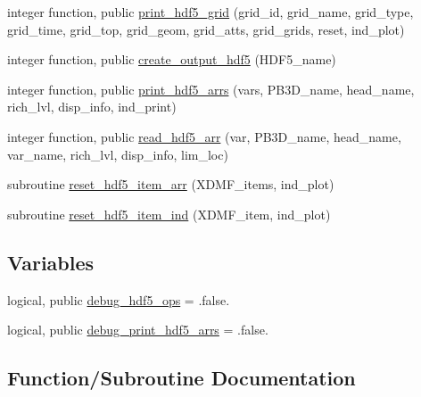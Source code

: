 \begin{DoxyCompactItemize}
integer function, public \hyperlink{namespacehdf5__ops_a144d595445778d89ec1a1bc0b12a94fb}{print\+\_\+hdf5\+\_\+grid} (grid\+\_\+id, grid\+\_\+name, grid\+\_\+type, grid\+\_\+time, grid\+\_\+top, grid\+\_\+geom, grid\+\_\+atts, grid\+\_\+grids, reset, ind\+\_\+plot)
\item 
integer function, public \hyperlink{namespacehdf5__ops_a1263636fffc4f4aa86f72bd5fd3352a0}{create\+\_\+output\+\_\+hdf5} (H\+D\+F5\+\_\+name)
\item 
integer function, public \hyperlink{namespacehdf5__ops_a18a07099350020b44d6fbe93ed36e804}{print\+\_\+hdf5\+\_\+arrs} (vars, P\+B3\+D\+\_\+name, head\+\_\+name, rich\+\_\+lvl, disp\+\_\+info, ind\+\_\+print)
\item 
integer function, public \hyperlink{namespacehdf5__ops_a5108e0d6f6b492cb981505ebceedd9ee}{read\+\_\+hdf5\+\_\+arr} (var, P\+B3\+D\+\_\+name, head\+\_\+name, var\+\_\+name, rich\+\_\+lvl, disp\+\_\+info, lim\+\_\+loc)
\item 
subroutine \hyperlink{namespacehdf5__ops_aed5661fcfa44910873fc0f87bb6ed914}{reset\+\_\+hdf5\+\_\+item\+\_\+arr} (X\+D\+M\+F\+\_\+items, ind\+\_\+plot)
\item 
subroutine \hyperlink{namespacehdf5__ops_a0f8db30a23145c71cb14906e7557cc33}{reset\+\_\+hdf5\+\_\+item\+\_\+ind} (X\+D\+M\+F\+\_\+item, ind\+\_\+plot)
\end{DoxyCompactItemize}
\subsection*{Variables}
\begin{DoxyCompactItemize}
\item 
logical, public \hyperlink{namespacehdf5__ops_a9b7c63811a63e9454539f1a2c89678b4}{debug\+\_\+hdf5\+\_\+ops} = .false.
\item 
logical, public \hyperlink{namespacehdf5__ops_a00bbaa77652e040350c9726668cc22ac}{debug\+\_\+print\+\_\+hdf5\+\_\+arrs} = .false.
\end{DoxyCompactItemize}


\subsection{Function/\+Subroutine Documentation}
\mbox{\label{namespacehdf5__ops_ade36dbd73b60da30e33a1059e590f734}} 
